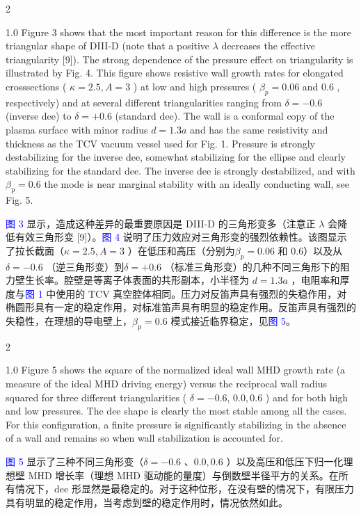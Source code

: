 \documentclass[utf8]{ctexart}
\newcommand\enzhbox[2]{
  	\quad\par \begin{paracol}{2} \colseprulecolor{black} 
  		\begin{spacing}{1.0}
  			\footnotesize  #1
  		\end{spacing}
  		\switchcolumn[1] 
  		#2
  	\end{paracol} \quad\par
  }
\begin{document}
\begin{sloppypar}
 
\enzhbox{  Figure 3 shows that the most important reason for this difference is the more triangular shape of DIII-D (note that a positive $\lambda$ decreases the effective triangularity \textcolor{green!50!black}{[9]}). The strong dependence of the pressure effect on triangularity is illustrated by Fig. 4. This figure shows resistive wall growth rates for elongated crosssections ( $\kappa=2.5, A=3$ ) at low and high pressures ( $\beta_{p}=0.06$ and 0.6 , respectively) and at several different triangularities ranging from $\delta=-0.6$ (inverse dee) to $\delta=+0.6$ (standard dee). The wall is a conformal copy of the plasma surface with minor radius $d=1.3 a$ and has the same resistivity and thickness as the TCV vacuum vessel used for Fig. 1. Pressure is strongly destabilizing for the inverse dee, somewhat stabilizing for the ellipse and clearly stabilizing for the standard dee. The inverse dee is strongly destabilized, and with $\beta_{\mathrm{p}}=0.6$ the mode is near marginal stability with an ideally conducting wall, see Fig. 5.}{
\textcolor{blue}{图 3} 显示，造成这种差异的最重要原因是 DIII-D 的三角形变多（注意正 $\lambda$  会降低有效三角形变 \textcolor{green!50!black}{[9]}）。\textcolor{blue}{图 4} 说明了压力效应对三角形变的强烈依赖性。该图显示了拉长截面（$\kappa=2.5, A=3$  ）在低压和高压（分别为$\beta_{p}=0.06$  和 0.6）以及从$\delta=-0.6$  （逆三角形变）到$\delta=+0.6$  （标准三角形变）的几种不同三角形下的阻力壁生长率。腔壁是等离子体表面的共形副本，小半径为 $d=1.3 a$ ，电阻率和厚度与\textcolor{blue}{图 1} 中使用的 TCV 真空腔体相同。压力对反笛声具有强烈的失稳作用，对椭圆形具有一定的稳定作用，对标准笛声具有明显的稳定作用。反笛声具有强烈的失稳性，在理想的导电壁上，$\beta_{\mathrm{p}}=0.6$  模式接近临界稳定，见\textcolor{blue}{图 5}。}
  
 
\enzhbox{  Figure 5 shows the square of the normalized ideal wall MHD growth rate (a measure of the ideal MHD driving energy) versus the reciprocal wall radius squared for three different triangularities ( $\delta=-0.6$, $0.0,0.6$ ) and for both high and low pressures. The dee shape is clearly the most stable among all the cases. For this configuration, a finite pressure is significantly stabilizing in the absence of a wall and remains so when wall stabilization is accounted for.}{
\textcolor{blue}{图 5} 显示了三种不同三角形变（$\delta=-0.6$ 、$0.0,0.6$  ）以及高压和低压下归一化理想壁 MHD 增长率（理想 MHD 驱动能的量度）与倒数壁半径平方的关系。在所有情况下，dee 形显然是最稳定的。对于这种位形，在没有壁的情况下，有限压力具有明显的稳定作用，当考虑到壁的稳定作用时，情况依然如此。}
  

\end{sloppypar}
\end{document}
